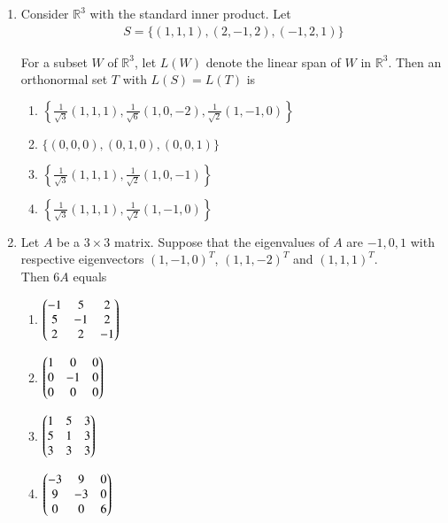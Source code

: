 \documentclass[journal]{IEEEtran}
\numberwithin{equation}{enumi}
\numberwithin{figure}{enumi}
\begin{document}
\begin{enumerate}
\item Consider $\mathbb{R}^3$ with the standard inner product. Let
\begin{align*}
 S = \{(1,1,1), (2,-1,2), (-1,2,1)\}   
\end{align*}

For a subset $W$ of $\mathbb{R}^3$, let $L(W)$ denote the linear span of $W$ in $\mathbb{R}^3$. Then an orthonormal set $T$ with $L(S) = L(T)$ is  \hfill{}
    \begin{multicols}{2}
    \begin{enumerate}
        \item $\left\{ \frac{1}{\sqrt{3}}(1,1,1), \frac{1}{\sqrt{6}}(1,0,-2), \frac{1}{\sqrt{2}}(1,-1,0) \right\}$ 
        \item $\{(0,0,0), (0,1,0), (0,0,1)\}$
        \item $\left\{ \frac{1}{\sqrt{3}}(1,1,1), \frac{1}{\sqrt{2}}(1,0,-1) \right\}$        \item $\left\{ \frac{1}{\sqrt{3}}(1,1,1), \frac{1}{\sqrt{2}}(1,-1,0) \right\}$
    \end{enumerate}
    \end{multicols}


\item Let $A$ be a $3 \times 3$ matrix. Suppose that the eigenvalues of $A$ are $-1, 0, 1$ with respective eigenvectors $(1, -1, 0)^T$, $(1, 1, -2)^T$ and $(1, 1, 1)^T$. \\Then $6A$ equals
\hfill{}

\begin{multicols}{2}
    \begin{enumerate}
        \item $\begin{pmatrix} -1 & 5 & 2 \\ 5 & -1 & 2 \\ 2 & 2 & -1 \end{pmatrix}$
        \item $\begin{pmatrix} 1 & 0 & 0 \\ 0 & -1 & 0 \\ 0 & 0 & 0 \end{pmatrix}$
        \item $\begin{pmatrix} 1 & 5 & 3 \\ 5 & 1 & 3 \\ 3 & 3 & 3 \end{pmatrix}$
        \item $\begin{pmatrix} -3 & 9 & 0 \\ 9 & -3 & 0 \\ 0 & 0 & 6\end{pmatrix}$ 
    \end{enumerate}
    \end{multicols}



\end{enumerate}
\end{document}

